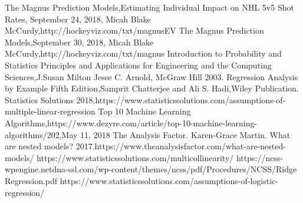 \documentclass{beamer}
\begin{document}
\begin{frame}
		The Magnus Prediction Models,Estimating Individual Impact on NHL 5v5 Shot Rates, September 24, 2018, Micah Blake McCurdy,http://hockeyviz.com/txt/magnusEV
		The Magnus Prediction Models,September 30, 2018, Micah Blake McCurdy,http://hockeyviz.com/txt/magnus
		Introduction to Probability and Statistics Principles and Applications for Engineering and the Computing Sciences,J.Susan Milton Jesse C. Arnold, McGraw Hill 2003.
		Regression Analysis by Example Fifth Edition,Samprit Chatterjee and Ali S. Hadi,Wiley Publication.
		Statistics Solutions 2018,https://www.statisticssolutions.com/assumptions-of-multiple-linear-regression
		Top 10 Machine Learning Algorithms,https://www.dezyre.com/article/top-10-machine-learning-algorithms/202,May 11, 2018
		The Analysis Factor. Karen-Grace Martin. What are nested models? 2017.https://www.theanalysisfactor.com/what-are-nested-models/
		https://www.statisticssolutions.com/multicollinearity/
		https://ncss-wpengine.netdna-ssl.com/wp-content/themes/ncss/pdf/Procedures/NCSS/Ridge Regression.pdf
		https://www.statisticssolutions.com/assumptions-of-logistic-regression/
\end{frame}
\end{document}
